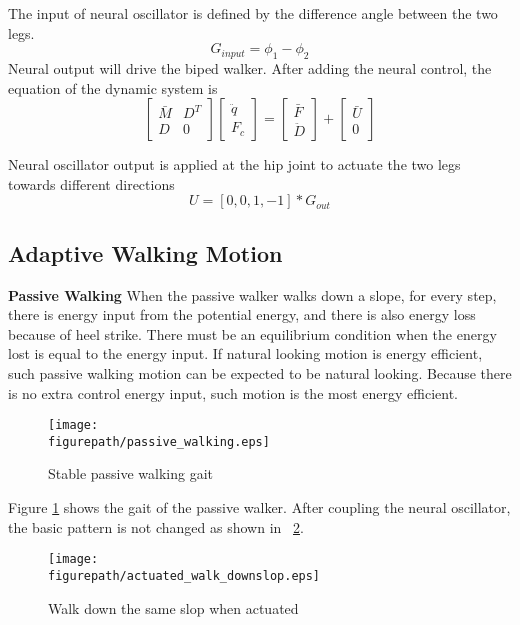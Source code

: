 The input of neural oscillator is defined by the difference angle between the two legs.
\[
G_{input}=\phi_{1}-\phi_{2}
\]
Neural output will drive the biped walker. After adding the neural control, the equation of the dynamic system is
\begin{equation}
\left[
\begin{array}{cc}
\bar{M} &D^{T}\\
D&	0 
\end{array}
\right]
\left[
\begin{array}{c}
\ddot{q} \\
F_{c}
\end{array}
\right]
=
\left[
\begin{array}{c}
\bar{F}\\
\ddot{D}
\end{array}
\right]
+
\left[
\begin{array}{c}
\bar{U}\\
0	
\end{array}
\right]
\end{equation}

Neural oscillator output is applied at the hip joint to actuate the two legs towards different directions
\[
U=[0,0,1,-1]*G_{out}
\]

\subsection{Adaptive Walking Motion}

\textbf{Passive Walking}
When the passive walker walks down a slope, for every step, there is energy input from the potential energy,
and there is also energy loss because of heel strike. 
There must be an equilibrium condition when the energy lost is equal to the energy input. 
If natural looking motion is energy efficient, such passive walking motion can be expected to be natural looking. 
Because there is no extra control energy input, such motion is the most energy efficient.

\begin{figure}[H]
\centering
\texttt{[image: \\figurepath/passive\_walking.eps]}
\caption{Stable passive walking gait}
\label{fig:passive_walk}
\end{figure}
Figure \ref{fig:passive_walk} shows the gait of the passive walker. 
After coupling the neural oscillator, the basic pattern is not changed  as shown in \figurename ~\ref{fig:stable_active_walk}.

\begin{figure}[H]
\centering
\texttt{[image: \\figurepath/actuated\_walk\_downslop.eps]}
\caption{Walk down the same slop when actuated}
\label{fig:stable_active_walk}
\end{figure}

